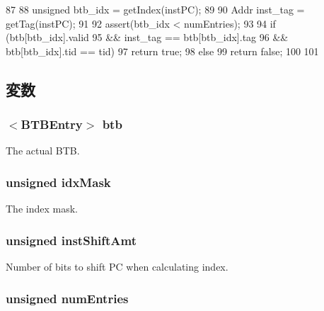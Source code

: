 \begin{DoxyCode}
87 {
88     unsigned btb_idx = getIndex(instPC);
89 
90     Addr inst_tag = getTag(instPC);
91 
92     assert(btb_idx < numEntries);
93 
94     if (btb[btb_idx].valid
95         && inst_tag == btb[btb_idx].tag
96         && btb[btb_idx].tid == tid) {
97         return true;
98     } else {
99         return false;
100     }
101 }
\end{DoxyCode}


\subsection{変数}
\hypertarget{classDefaultBTB_a8c05f4b6036b078da2303da4defcae7b}{
\subsubsection[{btb}]{$<${\bf BTBEntry}$>$ {\bf btb}}}
\label{classDefaultBTB_a8c05f4b6036b078da2303da4defcae7b}
The actual BTB. \hypertarget{classDefaultBTB_ad0d7752cbf4c876b1ef43c8a15509beb}{
\subsubsection[{idxMask}]{\setlength{\rightskip}{0pt plus 5cm}unsigned {\bf idxMask}}}
\label{classDefaultBTB_ad0d7752cbf4c876b1ef43c8a15509beb}
The index mask. \hypertarget{classDefaultBTB_a8ad2ee60a6143561753205840ad144e7}{
\subsubsection[{instShiftAmt}]{\setlength{\rightskip}{0pt plus 5cm}unsigned {\bf instShiftAmt}}}
\label{classDefaultBTB_a8ad2ee60a6143561753205840ad144e7}
Number of bits to shift PC when calculating index. \hypertarget{classDefaultBTB_a325de474a9f6652329339d9fc2ea09c0}{
\subsubsection[{numEntries}]{\setlength{\rightskip}{0pt plus 5cm}unsigned {\bf numEntries}}}
